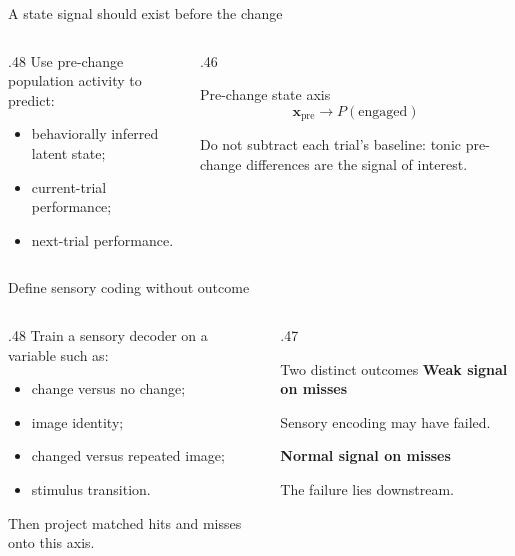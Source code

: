 \documentclass[aspectratio=169,10pt]{beamer}
\begin{document}

\begin{frame}{A state signal should exist before the change}
  \begin{columns}[c,onlytextwidth]
    \begin{column}{.48\textwidth}
      Use pre-change population activity to predict:
      \begin{itemize}
        \item behaviorally inferred latent state;
        \item current-trial performance;
        \item next-trial performance.
      \end{itemize}
    \end{column}
    \begin{column}{.46\textwidth}
      \begin{block}{Pre-change state axis}
        \[
          \mathbf{x}_{\mathrm{pre}}
          \longrightarrow P(\mathrm{engaged})
        \]
      \end{block}
      Do not subtract each trial's baseline: tonic pre-change differences are
      the signal of interest.
    \end{column}
  \end{columns}

\end{frame}

\begin{frame}{Define sensory coding without outcome}
  \begin{columns}[T,onlytextwidth]
    \begin{column}{.48\textwidth}
      Train a sensory decoder on a variable such as:
      \begin{itemize}
        \item change versus no change;
        \item image identity;
        \item changed versus repeated image;
        \item stimulus transition.
      \end{itemize}
      Then project matched hits and misses onto this axis.
    \end{column}
    \begin{column}{.47\textwidth}
      \begin{block}{Two distinct outcomes}
        \textbf{Weak signal on misses}

        Sensory encoding may have failed.

        \vspace{.65em}
        \textbf{Normal signal on misses}

        The failure lies downstream.
      \end{block}
    \end{column}
  \end{columns}
\end{frame}
\end{document}
